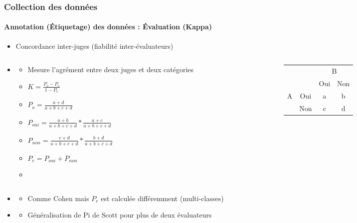\documentclass[xcolor=table]{beamer}
\begin{document}
\begin{frame}
	\frametitle{Collection des données}
	\framesubtitle{Annotation (Étiquetage) des données : Évaluation (Kappa)}
	
	\begin{itemize}
		\item Concordance inter-juges (fiabilité inter-évaluateurs) 
	\end{itemize}

\begin{columns}
\begin{column}{0.6\textwidth}
	\begin{itemize}
		\item {}
		\begin{itemize}
			\item Mesure l'agrément entre deux juges et deux catégories
			\item $K = \frac{P_o - P_e}{1 - P_e}$
			\item $P_o = \frac{a + d}{a+b+c+d}$
			\item $P_{oui} = \frac{a+b}{a+b+c+d} * \frac{a+c}{a+b+c+d}$
			\item $P_{non} = \frac{c+d}{a+b+c+d} * \frac{b+d}{a+b+c+d}$
			\item $P_e = P_{oui} + P_{non}$
			\item {}
		\end{itemize}
	\end{itemize}
\end{column}
\begin{column}{0.4\textwidth}
	\begin{tabular}{|c|c|c|c|}
		\cline{3-4}
		\multicolumn{2}{c|}{}& \multicolumn{2}{c|}{B} \\
		\cline{3-4}
		\multicolumn{2}{c|}{}& Oui & Non \\
		\hline
		\multirow{2}{*}{A} & Oui & a & b \\
		\cline{2-4}
		& Non & c & d \\
		\hline
	\end{tabular}
\end{column}
\end{columns}

\begin{itemize}
	\item {}
	\begin{itemize}
		\item Comme Cohen mais $P_e$ est calculée différemment (multi-classes)
	\end{itemize}
	\item {}
	\begin{itemize}
		\item Généralisation de Pi de Scott pour plus de deux évaluateurs
	\end{itemize}
\end{itemize}

\end{frame}
\end{document}
